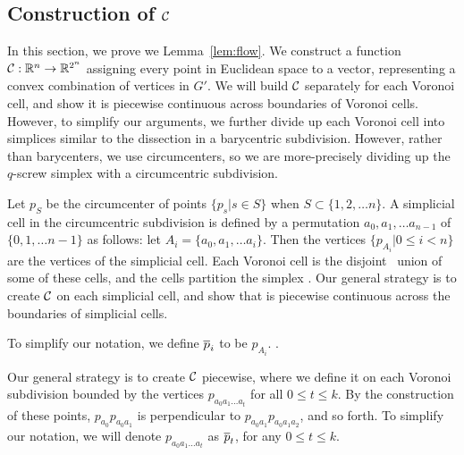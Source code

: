 \subsection{Construction of $\mathcal{C}$}

In this section, we prove we Lemma~\ref{lem:flow}. We construct a function
$\mathcal{C}:\mathbb{R}^n \rightarrow \mathbb{R}^{2^n}$ assigning every point in
Euclidean space to a vector, representing a convex combination of vertices
in $G'$. We will build $\mathcal{C}$ separately for each Voronoi cell, and show
it is piecewise continuous across boundaries of Voronoi cells. 
However, to simplify our arguments, we further divide up each Voronoi cell
into simplices similar to the dissection in a barycentric subdivision.
However, rather than barycenters, we use circumcenters, so we are
more-precisely dividing up the $q$-screw simplex with a circumcentric
subdivision. 

Let $p_{S}$ be the circumcenter of points $\{p_s | s \in S\}$ when $S
\subset \{1, 2, \ldots n\}$. A simplicial cell in the circumcentric subdivision is
defined by a permutation $a_0, a_1, \ldots a_{n-1}$ of $\{0, 1, \ldots
n-1\}$ as follows: let
$A_i = \{a_0, a_1, \ldots a_{i}\}$. Then the vertices $\{p_{A_i} | 0 \leq i
< n\}$ are the vertices of the simplicial cell.   Each Voronoi cell is the disjoint~ union of some of
these cells, and the cells partition the simplex . Our general strategy is to
create $\mathcal{C}$ on each simplicial cell, and show that is piecewise
continuous across the boundaries of simplicial cells.

To simplify our notation, we define $\overline{p}_i$ to be $p_{A_i}$. .


Our general strategy is to create $\mathcal{C}$ piecewise, where we define it on
each Voronoi subdivision bounded by the vertices $ p_{a_0a_1\ldots a_t}$
for all $0 \leq t \leq k$. By the construction of these points,
$p_{a_0}p_{a_0a_1}$ is perpendicular to $p_{a_0a_1}p_{a_0a_1a_2}$, and so
forth.
To simplify our notation, we will denote $p_{a_0a_1\ldots a_t}$ as $\overline{p}_t$,
for any $0 \leq t \leq k$. 

